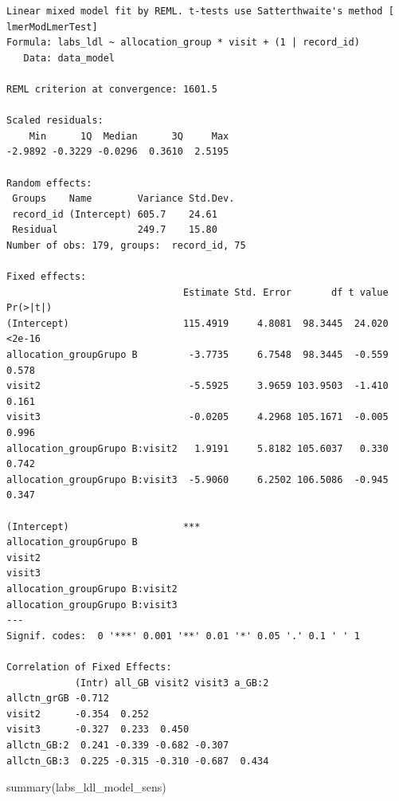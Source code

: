 \documentclass[
  letterpaper,
  DIV=11,
  numbers=noendperiod]{scrartcl}
\newenvironment{Shaded}{\begin{snugshade}}{\end{snugshade}}
\newcommand{\FunctionTok}[1]{\textcolor[rgb]{0.28,0.35,0.67}{#1}}
\newcommand{\NormalTok}[1]{\textcolor[rgb]{0.00,0.23,0.31}{#1}}
\begin{document}
\begin{verbatim}
Linear mixed model fit by REML. t-tests use Satterthwaite's method [
lmerModLmerTest]
Formula: labs_ldl ~ allocation_group * visit + (1 | record_id)
   Data: data_model

REML criterion at convergence: 1601.5

Scaled residuals: 
    Min      1Q  Median      3Q     Max 
-2.9892 -0.3229 -0.0296  0.3610  2.5195 

Random effects:
 Groups    Name        Variance Std.Dev.
 record_id (Intercept) 605.7    24.61   
 Residual              249.7    15.80   
Number of obs: 179, groups:  record_id, 75

Fixed effects:
                               Estimate Std. Error       df t value Pr(>|t|)
(Intercept)                    115.4919     4.8081  98.3445  24.020   <2e-16
allocation_groupGrupo B         -3.7735     6.7548  98.3445  -0.559    0.578
visit2                          -5.5925     3.9659 103.9503  -1.410    0.161
visit3                          -0.0205     4.2968 105.1671  -0.005    0.996
allocation_groupGrupo B:visit2   1.9191     5.8182 105.6037   0.330    0.742
allocation_groupGrupo B:visit3  -5.9060     6.2502 106.5086  -0.945    0.347
                                  
(Intercept)                    ***
allocation_groupGrupo B           
visit2                            
visit3                            
allocation_groupGrupo B:visit2    
allocation_groupGrupo B:visit3    
---
Signif. codes:  0 '***' 0.001 '**' 0.01 '*' 0.05 '.' 0.1 ' ' 1

Correlation of Fixed Effects:
            (Intr) all_GB visit2 visit3 a_GB:2
allctn_grGB -0.712                            
visit2      -0.354  0.252                     
visit3      -0.327  0.233  0.450              
allctn_GB:2  0.241 -0.339 -0.682 -0.307       
allctn_GB:3  0.225 -0.315 -0.310 -0.687  0.434
\end{verbatim}

\begin{Shaded}
\begin{Highlighting}[]
\FunctionTok{summary}\NormalTok{(labs\_ldl\_model\_sens)}
\end{Highlighting}
\end{Shaded}
\end{document}
